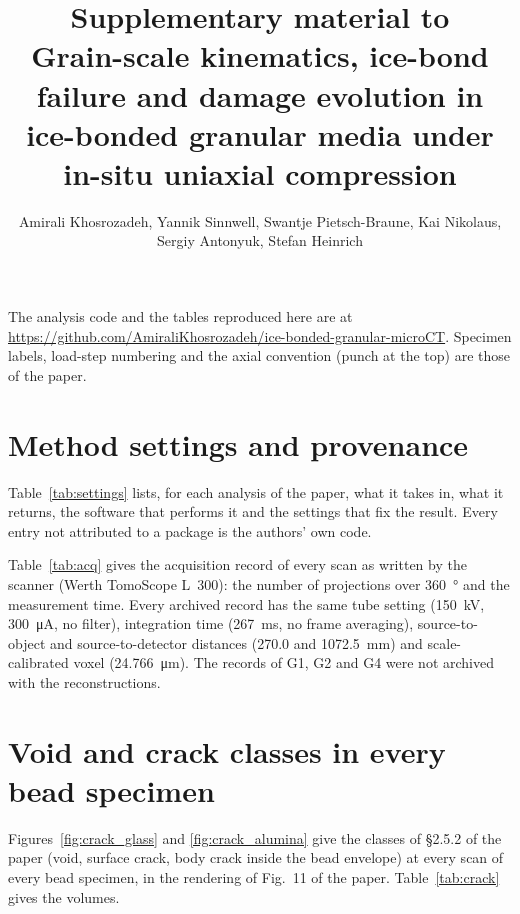 \documentclass[preprint,12pt]{elsarticle}
\begin{document}
\begin{frontmatter}
  \title{Supplementary material to\\Grain-scale kinematics, ice-bond failure
    and damage evolution in ice-bonded granular media under in-situ uniaxial
    compression}
  \author{Amirali Khosrozadeh, Yannik Sinnwell, Swantje Pietsch-Braune, Kai
    Nikolaus, Sergiy Antonyuk, Stefan Heinrich}
\end{frontmatter}

The analysis code and the tables reproduced here are at
\url{https://github.com/AmiraliKhosrozadeh/ice-bonded-granular-microCT}.
Specimen labels, load-step numbering and the axial convention (punch at the
top) are those of the paper.

\section{Method settings and provenance}
Table~\ref{tab:settings} lists, for each analysis of the paper, what it
takes in, what it returns, the software that performs it and the settings
that fix the result.  Every entry not attributed to a package is the
authors' own code.



Table~\ref{tab:acq} gives the acquisition record of every scan as written
by the scanner (Werth TomoScope L~300): the number of projections over
\SI{360}{\degree} and the measurement time.  Every archived record has the
same tube setting (\SI{150}{\kilo\volt}, \SI{300}{\micro\ampere}, no
filter), integration time (\SI{267}{\milli\second}, no frame averaging),
source-to-object and source-to-detector distances (\SI{270.0}{} and
\SI{1072.5}{\milli\meter}) and scale-calibrated voxel
(\SI{24.766}{\micro\meter}).  The records of G1, G2 and G4 were not
archived with the reconstructions.

\begin{table}[htbp]
  \centering
  \caption{Acquisition record of every scan, projections over
    \SI{360}{\degree} and measurement time.}
  \label{tab:acq}
  \footnotesize
  
\end{table}

\section{Void and crack classes in every bead specimen}
Figures~\ref{fig:crack_glass} and \ref{fig:crack_alumina} give the classes
of \S2.5.2 of the paper (void, surface crack, body crack inside the bead
envelope) at every scan of every bead specimen, in the rendering of Fig.~11
of the paper.  Table~\ref{tab:crack} gives the volumes.
\end{document}
